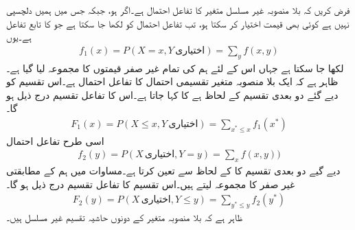 فرض کریں کہ بلا منصوبہ غیر مسلسل متغیر  کا تفاعل احتمال  ہے۔اگر  ہو، جبکہ  جس میں ہمیں دلچسپی نہیں ہے کوئی بھی قیمت اختیار کر سکتا ہو، تب تفاعل احتمال  کو  لکھا جا سکتا ہے جو  کا تابع تفاعل ہے۔یوں 
\begin{align}\label{مساوات_شماریات_حاشیہ_الف}
f_1(x)=P(X=x,Y\,\text{اختیاری})=\sum_y f(x,y)
\end{align} 
لکھا جا سکتا ہے جہاں اس  کے لئے ہم  کی  تمام غیر صفر قیمتوں کا مجموعہ لیا گیا ہے۔ظاہر ہے کہ  ایک بلا منصوبہ متغیر تقسیمی احتمال کا تفاعل احتمال ہے۔اس تقسیم کو دیے گئے دو بعدی تقسیم کے لحاظ ہے  کا  کہا جاتا ہے۔اس کا تفاعل تقسیم درج ذیل ہو گا۔
\begin{align}\label{مساوات_شماریات_حاشیہ_ب}
F_1(x)=P(X\le x,Y\, \text{اختیاری})=\sum_{x^*\le x} f_1(x^*)
\end{align}
اسی طرح تفاعل احتمال 
\begin{align}\label{مساوات_شماریات_حاشیہ_پ}
f_2(y)=P(X\,\text{اختیاری}, Y=y)=\sum_x f(x,y))
\end{align}
دیے گیے دو بعدی تقسیم کا  کے لحاظ سے  تعین کرتا ہے۔مساوات  میں ہم  کے مطابقتی غیر صفر  کا مجموعہ لیتے ہیں۔اس تقسیم کا تفاعل تقسیم درج ذیل ہو گا۔
\begin{align}
F_2(y)=P(X\,\text{اختیاری},Y\le y)=\sum_{y^*\le y}f_2(y^*)
\end{align}
ظاہر ہے کہ بلا منصوبہ متغیر  کے دونوں حاشیہ تقسیم  غیر مسلسل ہیں۔

